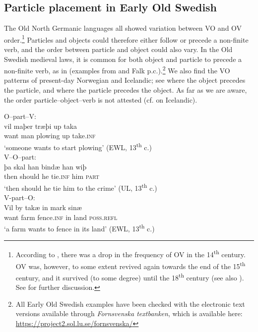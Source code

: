 \documentclass[output=paper]{langscibook}
\begin{document}
\subsection{Particle placement in Early Old Swedish}\label{sec:lalu:4.1}

The Old North Germanic languages all showed variation between VO and OV order.\footnote{According to \citet{Delsing1999}, there was a drop in the frequency of OV in the 14\textsuperscript{th} century. OV was, however, to some extent revived again towards the end of the 15\textsuperscript{th} century, and it survived (to some degree) until the 18\textsuperscript{th} century (see also \citealt{Petzell2011}). See  for further discussion.} Particles and objects could therefore either follow or precede a non-finite verb, and the order between particle and object could also vary. In the Old Swedish medieval laws, it is common for both object and particle to precede a non-finite verb, as in  (examples from \citealt{Ljunggren1932} and Falk p.c.).\footnote{All Early Old Swedish examples have been checked with the electronic text versions available through \textit{Fornsvenska textbanken}, which is available here: \url{https://project2.sol.lu.se/fornsvenska/}}  We also find the VO patterns of present-day Norwegian and Icelandic; see  where the object precedes the particle, and  where the particle precedes the object. As far as we are aware, the order particle–object–verb is not attested (cf. \citealt{Hroarsdottir2008} on Icelandic).


\ea\label{ex:lalu:21}
\ea\label{ex:lalu:21a} O–part–V:  \\
\gll  vil     maþer   træþi       up   taka \\
    want     man     plowing    up   take\textsc{.inf} \\
\glt `someone wants to start plowing’ (EWL, 13\textsuperscript{th} c.)\\

\ex\label{ex:lalu:21b} V–O–part:     \\
\gll  þa     skal     han   bindæ   han   wiþ \\
    then   should   he   tie\textsc{.inf}   him   \textsc{part} \\
\glt `then should he tie him to the crime’ (UL, 13\textsuperscript{th} c.)\\

\ex\label{ex:lalu:21c}  V-part–O:     \\
\gll  Vil     by   takæ       in   mark   sinæ \\
    want  farm   fence.\textsc{inf}   in   land   \textsc{poss.refl} \\
\glt `a farm wants to fence in its land’ (EWL, 13\textsuperscript{th} c.)\\
\z
\z
\end{document}
